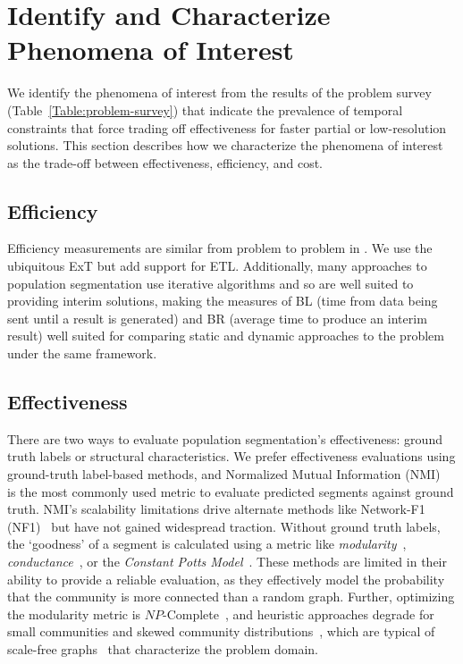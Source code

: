 \section{Identify and Characterize Phenomena of Interest}
\label{section:52-CD-Phenomena}
We identify the phenomena of interest from the results of the problem survey (Table~\ref{Table:problem-survey}) that indicate the prevalence of temporal constraints that force trading off effectiveness for faster partial or low-resolution solutions.
This section describes how we characterize the phenomena of interest as the trade-off between effectiveness, efficiency, and cost. 

\subsection{Efficiency}
Efficiency measurements are similar from problem to problem in \gai. 
We use the ubiquitous \ac{ExT} but add support for \ac{ETL}. 
Additionally, many approaches to population segmentation use iterative algorithms and so are well suited to providing interim solutions, making the measures of \ac{BL} (time from data being sent until a result is generated) and \ac{BR} (average time to produce an interim result) well suited for comparing static and dynamic approaches to the problem under the same framework.

\subsection{Effectiveness}
There are two ways to evaluate population segmentation's effectiveness: ground truth labels or structural characteristics. 
We prefer effectiveness evaluations using ground-truth label-based methods, and Normalized Mutual Information (NMI)~\cite{Strehl2002} is the most commonly used metric to evaluate predicted segments against ground truth. 
NMI's scalability limitations drive alternate methods like Network-F1 (NF1)~\cite{Rossetti2016, Rossetti2017, Rossetti2018} but have not gained widespread traction. 
Without ground truth labels, the `goodness' of a segment is calculated using a metric like \textit{modularity}~\cite{Newman2004a}, \textit{conductance}~\cite{Leskovec2010a}, or the \textit{Constant Potts Model}~\cite{Traag2011}.
These methods are limited in their ability to provide a reliable evaluation, as they effectively model the probability that the community is more connected than a random graph. 
Further, optimizing the modularity metric is $NP$-Complete~\cite{Brandes2006}, and heuristic approaches degrade for small communities and skewed community distributions~\cite{Fortunato2007}, which are typical of scale-free graphs~\cite{Barabasi1999, Girvan2002} that characterize the problem domain. 

